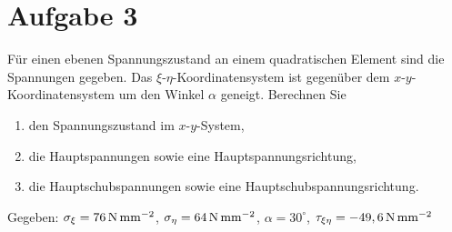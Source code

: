 \documentclass{exercise}
\begin{document}
    \section*{Aufgabe 3}

    \begin{problem}
        Für einen ebenen Spannungszustand an einem quadratischen Element sind die Spannungen gegeben.
        Das \(\xi\)-\(\eta\)-Koordinatensystem ist gegenüber dem \(x\)-\(y\)-Koordinatensystem um den Winkel \(\alpha\) geneigt.
        Berechnen Sie
        \begin{enumerate}
            \item den Spannungszustand im \(x\)-\(y\)-System,
            \item die Hauptspannungen sowie eine Hauptspannungsrichtung,
            \item die Hauptschubspannungen sowie eine Hauptschubspannungsrichtung.
        \end{enumerate}
        Gegeben: \(\sigma_\xi = 76\,\si{\newton\per\milli\meter\squared}\), \(\sigma_\eta = 64\,\si{\newton\per\milli\meter\squared}\), \(\alpha = 30^\circ\), \(\tau_{\xi\eta} = -49,6\,\si{\newton\per\milli\meter\squared}\)
    \end{problem}
\end{document}
